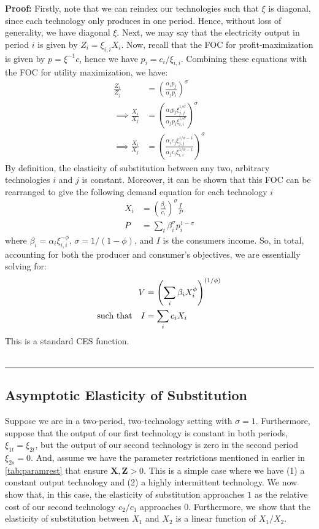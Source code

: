 \documentclass[11pt,a4paper,leqno]{extarticle}
\newenvironment{proof}[1][Proof]{\noindent\textbf{#1:} }{\ \rule{0.5em}{0.5em}}
\begin{document}
	\begin{proof}
		Firstly, note that we can reindex our technologies such that $\xi$ is diagonal, since each technology only produces in one period. Hence, without loss of generality, we have diagonal $\xi$. Next, we may say that the electricity output in period $i$ is given by $Z_i = \xi_{i,i} X_i$. Now, recall that the FOC for profit-maximization is given by $p = \xi^{-1} c$, hence we have $p_i = c_i / \xi_{i,i}$.  Combining these equations with the FOC for utility maximization, we have:
		\begin{align*}
		\frac{Z_i}{Z_j} &= \left( \frac{\alpha_i p_j}{\alpha_j p_i} \right)^\sigma \\
		\implies \frac{ X_i }{X_j} &= \left( \frac{ \alpha_i p_j \xi_{j,j}^{1/\sigma} }{ \alpha_j p_i \xi_{i,i}^{1/\sigma} } \right)^\sigma \\
		\implies \frac{ X_i }{X_j} &= \left( \frac{ \alpha_i c_j \xi_{j,j}^{1/\sigma - 1} }{ \alpha_j c_i \xi_{i,i}^{1/\sigma - 1} } \right)^\sigma
		\end{align*}
		By definition, the elasticity of substitution between any two, arbitrary technologies $i$ and $j$ is constant. Moreover, it can be shown that this FOC can be rearranged to give the following demand equation for each technology $i$
		\begin{align*}
		X_i &= \left(\frac{\beta_i}{c_i} \right)^\sigma \frac{I}{P} \\
		P &= \sum_t \beta_i^\sigma p_i^{1-\sigma}
		\end{align*}
		where $\beta_i = \alpha_i \xi_{i,i}^{-\phi}$, $\sigma = 1 / (1-\phi)$, and $I$ is the consumers income.	So, in total, accounting for both the producer and consumer's objectives, we are essentially solving for: 
		\begin{align*} 
		V &= \left( \sum_i \beta_i X_i^\phi \right)^{(1/\phi)}  \\
		\text{such that\quad} I &= \sum_i c_i X_i 
		\end{align*}
		This is a standard CES function.
		\\ \hfill
	\end{proof}
	
	\subsection{Asymptotic Elasticity of Substitution}
	
	\label{sec:asympeos}
	
	Suppose we are in a two-period, two-technology setting with $\sigma = 1$. Furthermore, suppose that the output of our first technology is constant in both periods, $\xi_{1t} = \xi_{2t}$, but the output of our second technology is zero in the second period $\xi_{2s} = 0$. And, assume we have the parameter restrictions mentioned in earlier in \autoref{tab:paramrest} that ensure $\mathbf{X}, \mathbf{Z} > 0$. This is a simple case where we have (1) a constant output technology and (2) a highly intermittent technology. We now show that, in this case, the elasticity of substitution approaches $1$ as the relative cost of our second technology $c_2/c_1$ approaches $0$. Furthermore, we show that the elasticity of substitution between $X_1$ and $X_2$ is a linear function of $X_1/X_2$.  
	
\end{document}
